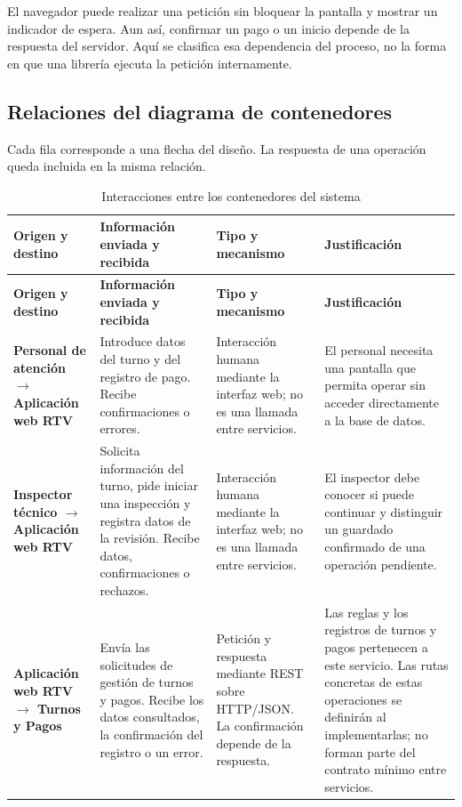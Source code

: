 \documentclass[11pt,a4paper]{article}
\begin{document}
	El navegador puede realizar una petición sin bloquear la pantalla y mostrar un indicador de espera. Aun así, confirmar un pago o un inicio depende de la respuesta del servidor. Aquí se clasifica esa dependencia del proceso, no la forma en que una librería ejecuta la petición internamente.
	
	\subsection{Relaciones del diagrama de contenedores}
	
	Cada fila corresponde a una flecha del diseño. La respuesta de una operación queda incluida en la misma relación.
	
	\begin{xltabular}{\textwidth}{L{2.9cm}XXX}
		\caption{Interacciones entre los contenedores del sistema}\label{tab:comunicacion}\\
		\toprule
		\textbf{Origen y destino} & \textbf{Información enviada y recibida} & \textbf{Tipo y mecanismo} & \textbf{Justificación} \\
		\midrule
		\endfirsthead
		\toprule
		\textbf{Origen y destino} & \textbf{Información enviada y recibida} & \textbf{Tipo y mecanismo} & \textbf{Justificación} \\
		\midrule
		\endhead
		\bottomrule
		\endfoot
		\textbf{Personal de atención $\rightarrow$ Aplicación web RTV} & Introduce datos del turno y del registro de pago. Recibe confirmaciones o errores. & Interacción humana mediante la interfaz web; no es una llamada entre servicios. & El personal necesita una pantalla que permita operar sin acceder directamente a la base de datos. \\
		\textbf{Inspector técnico $\rightarrow$ Aplicación web RTV} & Solicita información del turno, pide iniciar una inspección y registra datos de la revisión. Recibe datos, confirmaciones o rechazos. & Interacción humana mediante la interfaz web; no es una llamada entre servicios. & El inspector debe conocer si puede continuar y distinguir un guardado confirmado de una operación pendiente. \\
		\textbf{Aplicación web RTV $\rightarrow$ Turnos y Pagos} & Envía las solicitudes de gestión de turnos y pagos. Recibe los datos consultados, la confirmación del registro o un error. & Petición y respuesta mediante REST sobre HTTP/JSON. La confirmación depende de la respuesta. & Las reglas y los registros de turnos y pagos pertenecen a este servicio. Las rutas concretas de estas operaciones se definirán al implementarlas; no forman parte del contrato mínimo entre servicios. \\

\end{xltabular}
\end{document}
